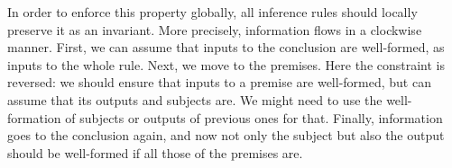 In order to enforce this property globally, all inference rules should locally
preserve it as an invariant.%
More precisely, information flows in a clockwise manner. First, we can assume that inputs
to the conclusion are well-formed, as inputs to the whole rule. Next, we move to the
premises. Here the constraint is reversed: we should ensure that inputs to a premise are
well-formed, but can assume that its outputs and subjects are. We might need to use
the well-formation of subjects or outputs of previous ones for that.
Finally, information goes to the conclusion again, and now not only the subject but also
the output should be well-formed if all those of the premises are.

